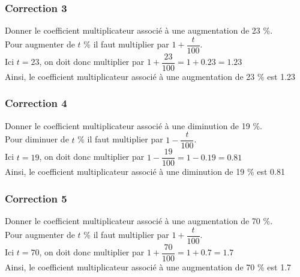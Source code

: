 \documentclass[15pt, mathserif]{beamer}
\begin{document}
\begin{frame}
\vspace{-10mm}
	\frametitle{Correction 3}
Donner le coefficient multiplicateur associé à une augmentation de 23 \%. \\ \bigskip 
 Pour augmenter de $t$ \%  il faut multiplier par $1+\dfrac{t}{100}$. \\ \bigskip Ici $t=23$, on doit donc multiplier par  $1+\dfrac{23}{100}=1+0.23=1.23$ \\ \bigskip Ainsi, le coefficient multiplicateur associé à une augmentation de 23 \% est 1.23\end{frame}


\begin{frame}
\vspace{-10mm}
	\frametitle{Correction 4}
Donner le coefficient multiplicateur associé à une diminution de 19 \%. \\ \bigskip 
 Pour diminuer de $t$ \%  il faut multiplier par $1-\dfrac{t}{100}$. \\ \bigskip Ici $t=19$, on doit donc multiplier par  $1-\dfrac{19}{100}=1-0.19=0.81$\\ \bigskip Ainsi, le coefficient multiplicateur associé à une diminution de 19 \% est 0.81\end{frame}


\begin{frame}
\vspace{-10mm}
	\frametitle{Correction 5}
Donner le coefficient multiplicateur associé à une augmentation de 70 \%. \\ \bigskip 
 Pour augmenter de $t$ \%  il faut multiplier par $1+\dfrac{t}{100}$. \\ \bigskip Ici $t=70$, on doit donc multiplier par  $1+\dfrac{70}{100}=1+0.7=1.7$ \\ \bigskip Ainsi, le coefficient multiplicateur associé à une augmentation de 70 \% est 1.7\end{frame}
\end{document}

